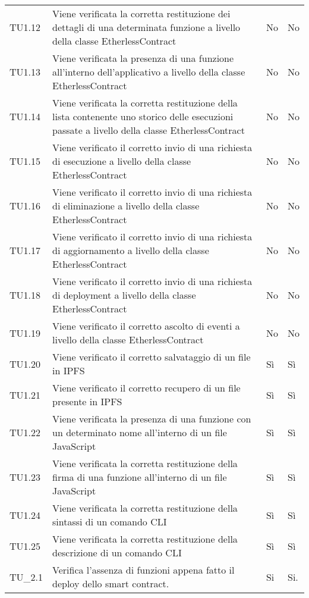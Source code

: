 \begin{longtable}{
		>{\centering}p{}
		>{}p{}
		>{\centering}p{}
		>{\centering}p{} }
		TU1.12 &
		Viene verificata la corretta restituzione dei dettagli di una determinata funzione a livello della classe EtherlessContract &
		No &
		No \tabularnewline

		TU1.13 &
		Viene verificata la presenza di una funzione all’interno dell’applicativo a livello della classe EtherlessContract &
		No &
		No \tabularnewline

		TU1.14 &
		Viene verificata la corretta restituzione della lista contenente uno storico delle esecuzioni passate a livello della classe EtherlessContract &
		No &
		No \tabularnewline

		TU1.15 &
		Viene verificato il corretto invio di una richiesta di esecuzione a livello della classe EtherlessContract &
		No &
		No \tabularnewline

		TU1.16 &
		Viene verificato il corretto invio di una richiesta di eliminazione a livello della classe EtherlessContract &
		No &
		No \tabularnewline

		TU1.17 &
		Viene verificato il corretto invio di una richiesta di aggiornamento a livello della classe EtherlessContract &
		No &
		No \tabularnewline

		TU1.18 &
		Viene verificato il corretto invio di una richiesta di deployment a livello della classe EtherlessContract &
		No &
		No \tabularnewline

		TU1.19 &
		Viene verificato il corretto ascolto di eventi a livello della classe EtherlessContract &
		No &
		No \tabularnewline

		TU1.20 &
		Viene verificato il corretto salvataggio di un file in IPFS &
		Sì &
		Sì \tabularnewline

		TU1.21 &
		Viene verificato il corretto recupero di un file presente in IPFS &
		Sì &
		Sì \tabularnewline

		TU1.22 &
		Viene verificata la presenza di una funzione con un determinato nome all’interno di un file JavaScript &
		Sì &
		Sì \tabularnewline

		TU1.23 &
		Viene verificata la corretta restituzione della firma di una funzione all’interno di un file JavaScript &
		Sì &
		Sì \tabularnewline

		TU1.24 &
		Viene verificata la corretta restituzione della sintassi di un comando CLI &
		Sì &
		Sì \tabularnewline

		TU1.25 &
		Viene verificata la corretta restituzione della descrizione di un comando CLI &
		Sì &
		Sì \tabularnewline

		TU_2.1   &  Verifica l'assenza di funzioni appena fatto il deploy dello smart contract. &
		Si & Si. \tabularnewline


\end{longtable}
